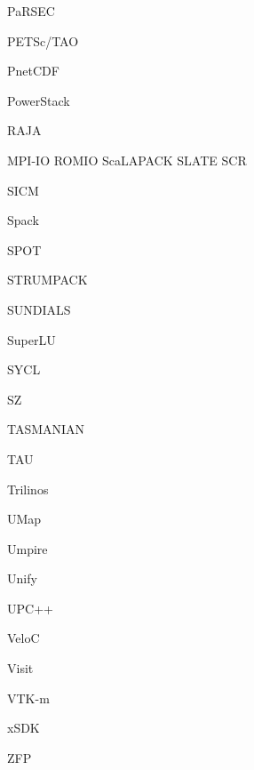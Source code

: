 PaRSEC

PETSc/TAO

PnetCDF

PowerStack

RAJA

MPI-IO
ROMIO
ScaLAPACK
SLATE
SCR

SICM

Spack

SPOT

STRUMPACK

SUNDIALS

SuperLU

SYCL

SZ

TASMANIAN

TAU

Trilinos

UMap

Umpire

Unify

UPC++

VeloC

Visit

VTK-m

xSDK

ZFP


